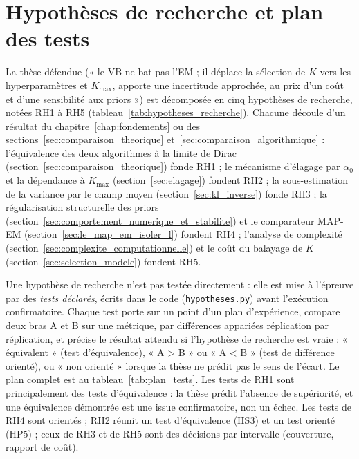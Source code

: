 \section{Hypothèses de recherche et plan des tests}\label{sec:hypotheses}
La thèse défendue (« le VB ne bat pas l'EM ; il déplace la sélection de $K$ vers les hyperparamètres et $K_{\max}$, apporte une incertitude approchée, au prix d'un coût et d'une sensibilité aux priors ») est décomposée en cinq hypothèses de recherche, notées RH1 à RH5 (tableau~\ref{tab:hypotheses_recherche}). Chacune découle d'un résultat du chapitre~\ref{chap:fondements} ou des sections~\ref{sec:comparaison_theorique} et~\ref{sec:comparaison_algorithmique} : l'équivalence des deux algorithmes à la limite de Dirac (section~\ref{sec:comparaison_theorique}) fonde RH1 ; le mécanisme d'élagage par $\alpha_0$ et la dépendance à $K_{\max}$ (section~\ref{sec:elagage}) fondent RH2 ; la sous-estimation de la variance par le champ moyen (section~\ref{sec:kl_inverse}) fonde RH3 ; la régularisation structurelle des priors (section~\ref{sec:comportement_numerique_et_stabilite}) et le comparateur MAP-EM (section~\ref{sec:le_map_em_isoler_l}) fondent RH4 ; l'analyse de complexité (section~\ref{sec:complexite_computationnelle}) et le coût du balayage de $K$ (section~\ref{sec:selection_modele}) fondent RH5.


Une hypothèse de recherche n'est pas testée directement : elle est mise à l'épreuve par des \emph{tests déclarés}, écrits dans le code (\texttt{hypotheses.py}) avant l'exécution confirmatoire. Chaque test porte sur un point d'un plan d'expérience, compare deux bras A et B sur une métrique, par différences appariées réplication par réplication, et précise le résultat attendu si l'hypothèse de recherche est vraie : « équivalent » (test d'équivalence), « A > B » ou « A < B » (test de différence orienté), ou « non orienté » lorsque la thèse ne prédit pas le sens de l'écart. Le plan complet est au tableau~\ref{tab:plan_tests}. Les tests de RH1 sont principalement des tests d'équivalence : la thèse prédit l'absence de supériorité, et une équivalence démontrée est une issue confirmatoire, non un échec. Les tests de RH4 sont orientés ; RH2 réunit un test d'équivalence (HS3) et un test orienté (HP5) ; ceux de RH3 et de RH5 sont des décisions par intervalle (couverture, rapport de coût).


